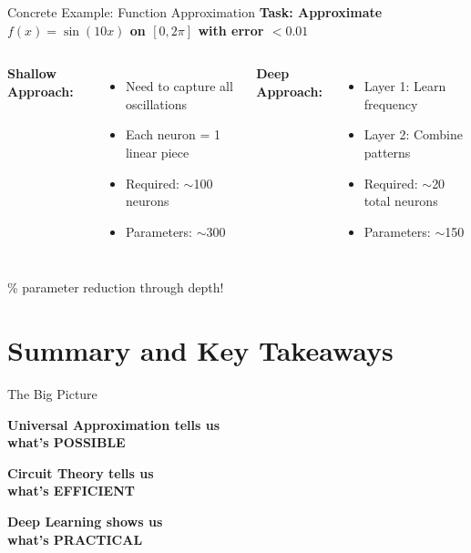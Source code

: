 \documentclass[xcolor=svgnames, 10pt, handout, standalone]{beamer}
\newcommand{\1}{\mathbf{1}}
\begin{document}
\begin{frame}{Concrete Example: Function Approximation}
\textbf{Task: Approximate $f(x) = \sin(10x)$ on $[0, 2\pi]$ with error $< 0.01$}

\vspace{0.5cm}

\begin{columns}
\textbf{Shallow Approach:}
\begin{itemize}
    \item Need to capture all oscillations
    \item Each neuron = 1 linear piece
    \item Required: $\sim$100 neurons
    \item Parameters: $\sim$300
\end{itemize}

\textbf{Deep Approach:}
\begin{itemize}
    \item Layer 1: Learn frequency
    \item Layer 2: Combine patterns
    \item Required: $\sim$20 total neurons
    \item Parameters: $\sim$150
\end{itemize}
\end{columns}

\pause
{}\% parameter reduction through depth!
\end{frame}

\section{Summary and Key Takeaways}

\begin{frame}{The Big Picture}
\begin{center}
\Large{\textbf{Universal Approximation tells us\\what's POSSIBLE}}

\vspace{0.5cm}

\Large{\textbf{Circuit Theory tells us\\what's EFFICIENT}}

\vspace{0.5cm}

\Large{\textbf{Deep Learning shows us\\what's PRACTICAL}}
\end{center}
\end{frame}
\end{document}
